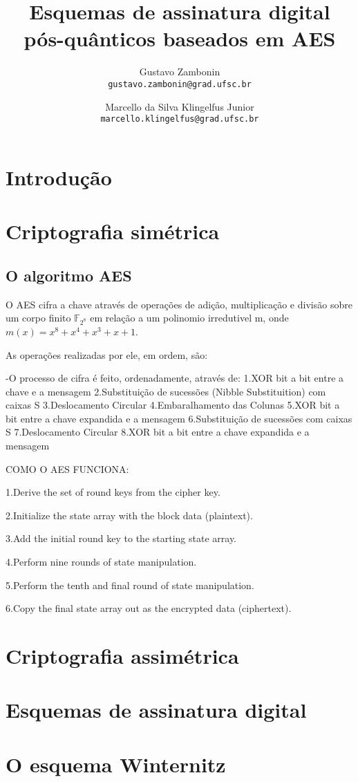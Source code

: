 \documentclass{article}
\title{Esquemas de assinatura digital pós-quânticos baseados em AES}
\author{Gustavo Zambonin \\ \texttt{gustavo.zambonin@grad.ufsc.br} \and Marcello da Silva Klingelfus Junior \\ \texttt{marcello.klingelfus@grad.ufsc.br}}
\date{}
\begin{document}
\maketitle


\section*{Introdução}

\section*{Criptografia simétrica}

\subsection*{O algoritmo AES}

O AES cifra a chave através de operações de adição, multiplicação e divisão sobre um corpo finito $\mathbb{F}_{2^{8}}$ em relação a um polinomio irredutivel m, onde $m(x) = x^{8} + x^{4} + x^{3} + x + 1$. 

As operações realizadas por ele, em ordem, são:


-O processo de cifra é feito, ordenadamente, através de: 
1.XOR bit a bit entre a chave e a mensagem
2.Substituição de sucessões (Nibble Substituition) com caixas S
3.Deslocamento Circular
4.Embaralhamento das Colunas
5.XOR bit a bit entre a chave expandida e a mensagem
6.Substituição de sucessões com caixas S
7.Deslocamento Circular
8.XOR bit a bit entre a chave expandida e a mensagem


COMO O AES FUNCIONA:

1.Derive the set of round keys from the cipher key.

2.Initialize the state array with the block data (plaintext).

3.Add the initial round key to the starting state array.

4.Perform nine rounds of state manipulation.

5.Perform the tenth and final round of state manipulation.

6.Copy the final state array out as the encrypted data (ciphertext).


\section*{Criptografia assimétrica}

\section*{Esquemas de assinatura digital}

\section*{O esquema Winternitz}
\end{document}
